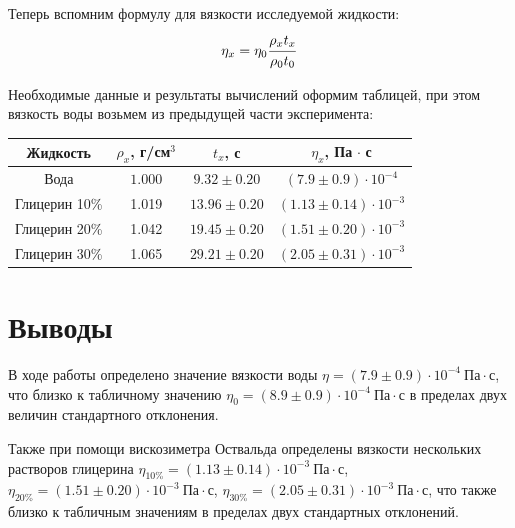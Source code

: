 \documentclass[12pt,a4paper]{scrartcl}
\begin{document}
	Теперь вспомним формулу для вязкости исследуемой жидкости:
	$$\eta_x = \eta_0 \dfrac{\strut \rho_x t_x}{\strut \rho_0 t_0}$$
	
	Необходимые данные и результаты вычислений оформим таблицей, при этом вязкость воды возьмем из предыдущей части эксперимента:
	\begin{center}
		\begin{tabular}{|c|c|c|c|}
			\hline
			Жидкость & $\rho_x$, г/см$^3$ & $t_x$, с & $\eta_x$, Па$\,\cdot\,$с
			\\\hline
			Вода & $1.000$ & $9.32 \pm 0.20$ & $(7.9 \pm 0.9) \cdot 10^{-4}$
			\\\hline
			Глицерин 10\% & 1.019 & $13.96 \pm 0.20$ & $(1.13 \pm 0.14) \cdot 10^{-3}$
			\\\hline
			Глицерин 20\% & 1.042 & $19.45 \pm 0.20$ & $(1.51 \pm 0.20) \cdot 10^{-3}$
			\\\hline
			Глицерин 30\% & 1.065 & $29.21 \pm 0.20$ & $(2.05 \pm 0.31) \cdot 10^{-3}$
			\\\hline
		\end{tabular}
	\end{center}
	
	\section{Выводы}
	
	В ходе работы определено значение вязкости воды $\eta = (7.9 \pm 0.9)\cdot 10^{-4}\ \text{Па}\cdot\text{с}$, что близко к табличному значению $\eta_0 = (8.9 \pm 0.9)\cdot 10^{-4}\ \text{Па}\cdot\text{с}$ в пределах двух величин стандартного отклонения.
	
	Также при помощи вискозиметра Оствальда определены вязкости нескольких растворов глицерина $\eta_{10\%} = (1.13 \pm 0.14)\cdot 10^{-3}\ \text{Па}\cdot\text{с}$, $\eta_{20\%} = (1.51 \pm 0.20)\cdot 10^{-3}\ \text{Па}\cdot\text{с}$, $\eta_{30\%} = (2.05 \pm 0.31)\cdot 10^{-3}\ \text{Па}\cdot\text{с}$, что также близко к табличным значениям в пределах двух стандартных отклонений.
\end{document}
